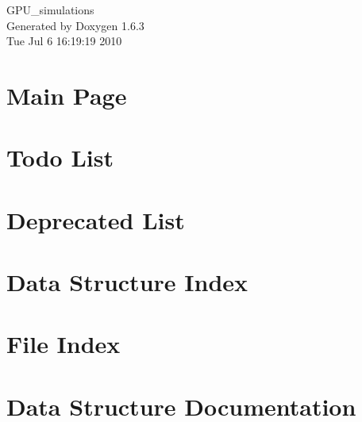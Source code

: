 \documentclass[a4paper]{book}
\begin{document}
\hypersetup{pageanchor=false}
\begin{titlepage}
\vspace*{7cm}
\begin{center}
{\Large GPU\_\-simulations }\\
\vspace*{1cm}
{\large Generated by Doxygen 1.6.3}\\
\vspace*{0.5cm}
{\small Tue Jul 6 16:19:19 2010}\\
\end{center}
\end{titlepage}
\clearemptydoublepage
{}
\tableofcontents
\clearemptydoublepage
{}
\hypersetup{pageanchor=true}
\chapter{Main Page}
\label{index}\hypertarget{index}{}
\chapter{Todo List}
\label{todo}
\hypertarget{todo}{}

\chapter{Deprecated List}
\label{deprecated}
\hypertarget{deprecated}{}

\chapter{Data Structure Index}

\chapter{File Index}

\chapter{Data Structure Documentation}
















\end{document}
